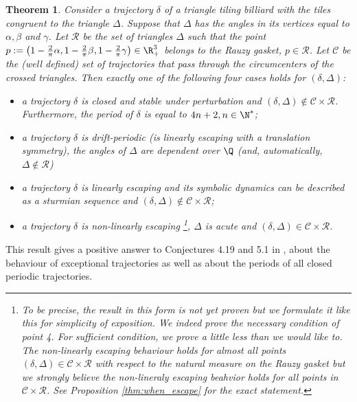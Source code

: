 \documentclass[12pt]{article}
\newtheorem{theorem}{Theorem}
\theoremstyle{definition}
\begin{document}
\begin{theorem}
Consider a trajectory $\delta$ of a triangle tiling billiard with the tiles congruent to the triangle $\Delta$. Suppose that $\Delta$ has the angles in its vertices equal to $\alpha, \beta$ and $\gamma$. Let $\mathcal{R}$ be the set of triangles $\Delta$ such that the point $p:=\left(1-\frac{2}{\pi}\alpha, 1-\frac{2}{\pi}\beta, 1-\frac{2}{\pi}\gamma \right) \in \R^3_+$ belongs to the Rauzy gasket, $p \in \boldsymbol{\mathcal{R}}$. 
Let $\mathcal{C}$ be the (well defined) set of trajectories that pass through the circumcenters of the crossed triangles.
Then exactly one of the following four cases holds for $(\delta, \Delta)$: 
\begin{itemize}
\item[1.] a trajectory $\delta$ is closed and stable under perturbation and $(\delta,\Delta) \notin \mathcal{C} \times \mathcal{R}$. Furthermore, the period of $\delta$ is equal to $4n+2, n \in \N^*$;
\item[2.] a trajectory $\delta$ is drift-periodic (is linearly escaping with a translation symmetry), the angles of $\Delta$ are dependent over $\Q$ (and, automatically, $\Delta \notin \mathcal{R}$)
\item[3.] a trajectory $\delta$ is linearly escaping and its symbolic dynamics can be described as a sturmian sequence and $(\delta,\Delta) \notin \mathcal{C} \times \mathcal{R}$;
\item[4.] a trajectory $\delta$ is non-linearly escaping \footnote{To be precise, the result in this form is not yet proven but we formulate it like this for simplicity of exposition. We indeed prove the necessary condition of point 4. For sufficient condition, we prove a little less than we would like to. The non-linearly escaping behaviour holds for almost all points $(\delta,\Delta) \in \mathcal{C} \times \mathcal{R}$ with respect to the natural measure on the Rauzy gasket but we strongly believe the non-lineraly escaping beahvior holds for all points in $\mathcal{C} \times \mathcal{R}$. See Proposition \ref{thm:when_escape} for the exact statement.}, $\Delta$ is acute and $(\delta,\Delta) \in \mathcal{C} \times \mathcal{R}$.
\end{itemize}
\label{thm:intro_main_theorem}
\end{theorem}

This result gives a positive answer to  Conjectures 4.19  and 5.1 in \cite{BDFI18}, about the behaviour of exceptional trajectories as well as about the periods of all closed periodic trajectories. 
\end{document}
